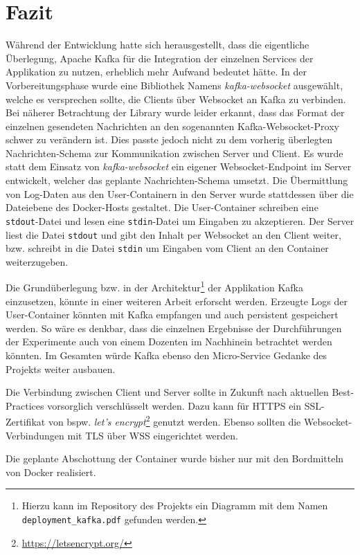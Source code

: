 \chapter{Fazit}
Während der Entwicklung hatte sich herausgestellt, dass die eigentliche Überlegung, Apache Kafka für die Integration der einzelnen Services der Applikation zu nutzen, erheblich mehr Aufwand bedeutet hätte.
In der Vorbereitungsphase wurde eine Bibliothek Namens \textit{kafka-websocket} ausgewählt, welche es versprechen sollte, die Clients über Websocket an Kafka zu verbinden.
Bei näherer Betrachtung der Library wurde leider erkannt, dass das Format der einzelnen gesendeten Nachrichten an den sogenannten Kafka-Websocket-Proxy schwer zu verändern ist.
Dies passte jedoch nicht zu dem vorherig überlegten Nachrichten-Schema zur Kommunikation zwischen Server und Client.
Es wurde statt dem Einsatz von \textit{kafka-websocket} ein eigener Websocket-Endpoint im Server entwickelt, welcher das geplante Nachrichten-Schema umsetzt.
Die Übermittlung von Log-Daten aus den User-Containern in den Server wurde stattdessen über die Dateiebene des Docker-Hosts gestaltet.
Die User-Container schreiben eine \texttt{stdout}-Datei und lesen eine \texttt{stdin}-Datei um Eingaben zu akzeptieren.
Der Server liest die Datei \texttt{stdout} und gibt den Inhalt per Websocket an den Client weiter, bzw. schreibt in die Datei \texttt{stdin} um Eingaben vom Client an den Container weiterzugeben.
\par
Die Grundüberlegung bzw. in der Architektur\footnote{Hierzu kann im Repository des Projekts ein Diagramm mit dem Namen \texttt{deployment\_kafka.pdf} gefunden werden.} der Applikation Kafka einzusetzen, könnte in einer weiteren Arbeit erforscht werden.
Erzeugte Logs der User-Container könnten mit Kafka empfangen und auch persistent gespeichert werden.
So wäre es denkbar, dass die einzelnen Ergebnisse der Durchführungen der Experimente auch von einem Dozenten im Nachhinein betrachtet werden könnten.
Im Gesamten würde Kafka ebenso den Micro-Service Gedanke des Projekts weiter ausbauen.
\par
Die Verbindung zwischen Client und Server sollte in Zukunft nach aktuellen Best-Practices vorsorglich verschlüsselt werden.
Dazu kann für HTTPS ein SSL-Zertifikat von \ac{bspw.} \textit{let's encrypt}\footnote{\url{https://letsencrypt.org/}} genutzt werden.
Ebenso sollten die Websocket-Verbindungen mit TLS über WSS eingerichtet werden.
\par
Die geplante Abschottung der Container wurde bisher nur mit den Bordmitteln von Docker realisiert.
